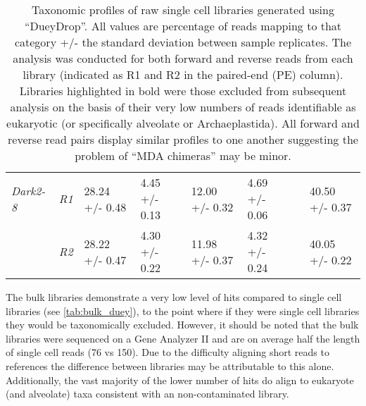 \begin{table}[h!]
{\begin{tabular}{|l||l|l|l|l|l|l|l|}
         \textit{Dark2-8}     & \textit{R1}                   & 28.24 +/- 0.48     & 4.45 +/- 0.13     & 12.00 +/- 0.32     & 4.69 +/- 0.06          &  & 40.50 +/- 0.37      \\ 
                              & \textit{R2}                   & 28.22 +/- 0.47     & 4.30 +/- 0.22     & 11.98 +/- 0.37     & 4.32 +/- 0.24          &  & 40.05 +/- 0.22      \\
         \hline
 \end{tabular}}
     \caption[DueyDrop Taxonomic Profile Summary]{Taxonomic profiles of raw single cell libraries generated using ``DueyDrop''. All values are percentage of reads mapping to that category +/- the standard deviation between sample replicates.  
         The analysis was conducted for both forward and reverse reads from each library (indicated as R1 and R2 in the paired-end (PE) column).
         Libraries highlighted in bold were those excluded from subsequent analysis on the basis of their very low numbers of reads identifiable as 
 eukaryotic (or specifically alveolate or Archaeplastida). All forward and reverse read pairs display similar profiles to one another suggesting
 the problem of ``MDA chimeras'' may be minor.}
 \label{tab:sct_duey}
\end{table}

The bulk libraries demonstrate a very low level of hits compared to single cell libraries (see \cref{tab:bulk_duey}), 
to the point where if they were single cell libraries they would be taxonomically excluded. 
However, it should be noted that the bulk libraries were sequenced on a Gene Analyzer II and are on average
half the length of single cell reads (\SI{76}{\bp} vs \SI{150}{\bp}). Due to the difficulty aligning short reads
to references the difference between libraries may be attributable to this alone. 
Additionally, the vast majority of the lower number of hits do align to eukaryote (and alveolate) 
taxa consistent with an non-contaminated library. 

